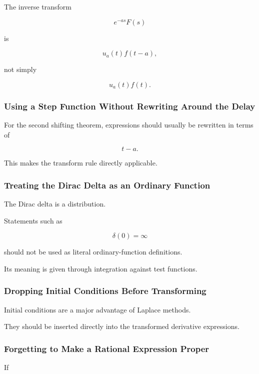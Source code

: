 The inverse transform

\[
e^{-as}F(s)
\]

is

\[
\boxed{
u_a(t)f(t-a),
}
\]

not simply

\[
u_a(t)f(t).
\]

\subsubsection{Using a Step Function Without Rewriting Around the Delay}

For the second shifting theorem, expressions should usually be rewritten
in terms of

\[
\boxed{
t-a.
}
\]

This makes the transform rule directly applicable.

\subsubsection{Treating the Dirac Delta as an Ordinary Function}

The Dirac delta is a distribution.

Statements such as

\[
\delta(0)=\infty
\]

should not be used as literal ordinary-function definitions.

Its meaning is given through integration against test functions.

\subsubsection{Dropping Initial Conditions Before Transforming}

Initial conditions are a major advantage of Laplace methods.

They should be inserted directly into the transformed derivative
expressions.

\subsubsection{Forgetting to Make a Rational Expression Proper}

If

